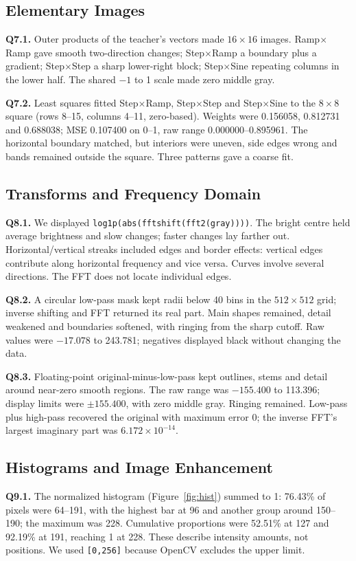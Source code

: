 \documentclass[10pt,a4paper]{article}
\begin{document}
\subsection{Elementary Images}
\textbf{Q7.1.} Outer products of the teacher's vectors made \(16\times16\)
images. Ramp\(\times\)Ramp gave smooth two-direction changes;
Step\(\times\)Ramp a boundary plus a gradient; Step\(\times\)Step a sharp
lower-right block; Step\(\times\)Sine repeating columns in the lower half.
The shared \(-1\) to 1 scale made zero middle gray.

\begin{samepage}
\textbf{Q7.2.} Least squares fitted Step\(\times\)Ramp, Step\(\times\)Step and
Step\(\times\)Sine to the \(8\times8\) square (rows 8--15, columns 4--11,
zero-based). Weights were 0.156058, 0.812731 and 0.688038;
MSE 0.107400 on 0--1, raw range 0.000000--0.895961. The horizontal boundary
matched, but interiors were uneven, side edges wrong and bands remained
outside the square. Three patterns gave a coarse fit.
\par\end{samepage}


\subsection{Transforms and Frequency Domain}
\textbf{Q8.1.} We displayed \texttt{log1p(abs(fftshift(fft2(gray))))}.
The bright centre held average brightness and slow changes; faster changes
lay farther out. Horizontal/vertical streaks included edges and border effects:
vertical edges contribute along horizontal frequency and vice versa.
Curves involve several directions. The FFT does not locate individual edges.

\textbf{Q8.2.} A circular low-pass mask kept radii below 40 bins in the
\(512\times512\) grid; inverse shifting and FFT returned its real part.
Main shapes remained, detail weakened and boundaries softened, with ringing
from the sharp cutoff. Raw values were
\(-17.078\) to 243.781; negatives displayed black without changing the data.

\textbf{Q8.3.} Floating-point original-minus-low-pass kept outlines, stems and
detail around near-zero smooth regions. The raw range was \(-155.400\) to
113.396; display limits were \(\pm155.400\), with zero middle gray.
Ringing remained. Low-pass plus high-pass recovered the original with maximum
error 0; the inverse FFT's largest imaginary part was \(6.172\times10^{-14}\).


\subsection{Histograms and Image Enhancement}
\textbf{Q9.1.} The normalized histogram (Figure~\ref{fig:hist}) summed to 1: 76.43\% of pixels were
64--191, with the highest bar at 96 and another group around 150--190;
the maximum was 228. Cumulative proportions were 52.51\% at 127 and 92.19\%
at 191, reaching 1 at 228. These describe intensity amounts, not positions.
We used \texttt{[0,256]} because OpenCV excludes the upper limit.
\end{document}
